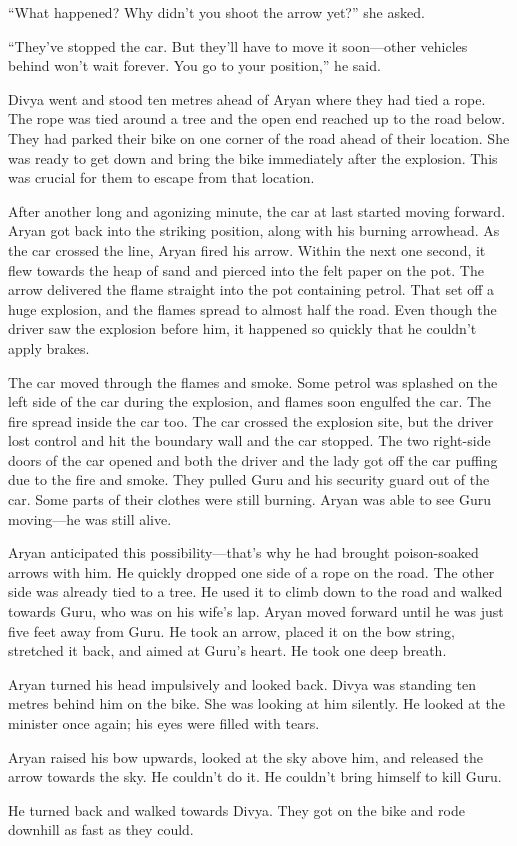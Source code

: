 “What happened? Why didn't you shoot the arrow yet?” she asked.

“They've stopped the car. But they'll have to move it soon—other vehicles
behind won't wait forever. You go to your position,” he said.

Divya went and stood ten metres ahead of Aryan where they had tied a rope. The
rope was tied around a tree and the open end reached up to the road below. They
had parked their bike on one corner of the road ahead of their location. She was
ready to get down and bring the bike immediately after the explosion. This was
crucial for them to escape from that location.

After another long and agonizing minute, the car at last started moving forward.
Aryan got back into the striking position, along with his burning arrowhead. As the
car crossed the line, Aryan fired his arrow. Within the next one second, it flew
towards the heap of sand and pierced into the felt paper on the pot. The arrow
delivered the flame straight into the pot containing petrol. That set off a
huge explosion, and the flames spread to almost half the road. Even though the
driver saw the explosion before him, it happened so quickly that he couldn't
apply brakes.

The car moved through the flames and smoke. Some petrol was splashed
on the left side of the car during the explosion, and flames soon engulfed the
car. The fire spread inside the car too. The car crossed the explosion site, but
the driver lost control and hit the boundary wall and the car stopped. The two
right-side doors of the car opened and both the driver and the lady got off the
car puffing due to the fire and smoke. They pulled Guru and his security guard out
of the car. Some parts of their clothes were still burning. Aryan was able to
see Guru moving—he was still alive.

Aryan anticipated this possibility—that's why he had brought poison-soaked
arrows with him. He quickly dropped one side of a rope on the road. The other
side was already tied to a tree. He used it to climb down to the road and walked
towards Guru, who was on his wife's lap. Aryan moved forward until he was just
five feet away from Guru. He took an arrow, placed it on the bow string,
stretched it back, and aimed at Guru's heart. He took one deep breath.

Aryan turned his head impulsively and looked back. Divya was standing ten metres
behind him on the bike. She was looking at him silently. He looked at the
minister once again; his eyes were filled with tears.

Aryan raised his bow upwards, looked at the sky above him, and released the
arrow towards the sky. He couldn't do it. He couldn't bring himself to kill
Guru.

He turned back and walked towards Divya. They got on the bike and rode downhill
as fast as they could.
